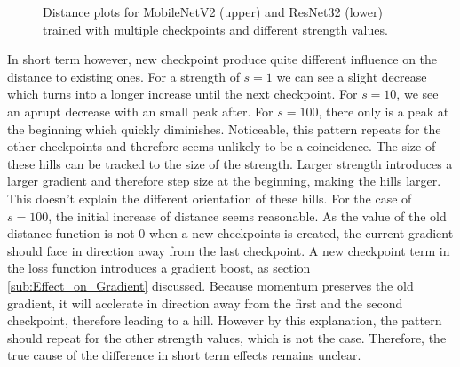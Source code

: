 \begin{figure}[H]
\begin{center}
        \caption{Distance plots for MobileNetV2 (upper) and ResNet32 (lower) trained with multiple checkpoints and different strength values.}
    \end{center}
\end{figure}

In short term however, new checkpoint produce quite different influence on the
distance to existing ones. For a strength of $s=1$ we can see a slight decrease
which turns into a longer increase until the next checkpoint. For $s=10$, we see
an aprupt decrease with an small peak after. For $s=100$, there only is a peak
at the beginning which quickly diminishes. Noticeable, this pattern repeats for
the other checkpoints and therefore seems unlikely to be a coincidence. The size
of these hills can be tracked to the size of the strength. Larger strength
introduces a larger gradient and therefore step size at the beginning, making
the hills larger. This doesn't explain the different orientation of these hills.
For the case of $s=100$, the initial increase of distance seems reasonable. As
the value of the old distance function is not 0 when a new checkpoints is
created, the current gradient should face in direction away from the last
checkpoint. A new checkpoint term in the loss function introduces a gradient
boost, as section \ref{sub:Effect_on_Gradient} discussed. Because momentum
preserves the old gradient, it will acclerate in direction away from the first
and the second checkpoint, therefore leading to a hill. However by this
explanation, the pattern should repeat for the other strength values, which is
not the case. Therefore, the true cause of the difference in short term effects
remains unclear.



